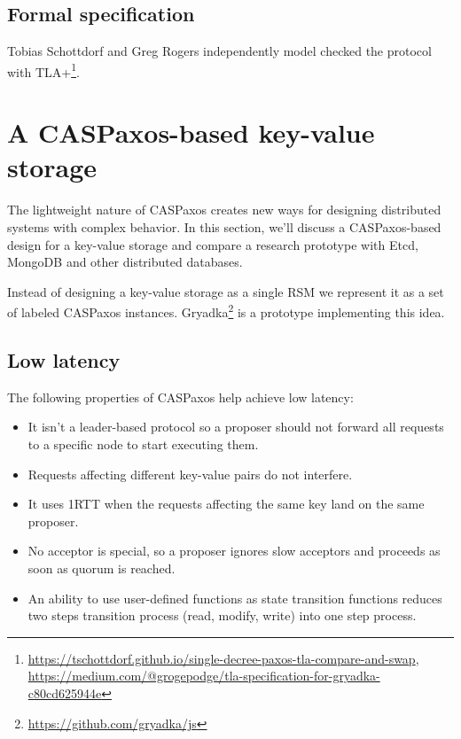 \documentclass[a4paper,USenglish]{lipics-v2018}
\theoremstyle{definition}
\begin{document}
\subsection{Formal specification}

Tobias Schottdorf and Greg Rogers independently model checked the protocol with TLA+\footnote{\href{https://tschottdorf.github.io/single-decree-paxos-tla-compare-and-swap}{https://tschottdorf.github.io/single-decree-paxos-tla-compare-and-swap}, \href{https://medium.com/@grogepodge/tla-specification-for-gryadka-c80cd625944e}{https://medium.com/@grogepodge/tla-specification-for-gryadka-c80cd625944e}}.

\section{A CASPaxos-based key-value storage}

The lightweight nature of CASPaxos creates new ways for designing distributed systems with complex behavior. In this section, we'll discuss a CASPaxos-based design for a key-value storage and compare a research prototype with Etcd, MongoDB and other distributed databases.

Instead of designing a key-value storage as a single RSM we represent it as a set of labeled CASPaxos instances. Gryadka\footnote{\href{https://github.com/gryadka/js}{https://github.com/gryadka/js}} is a prototype implementing this idea.

\subsection{Low latency}

The following properties of CASPaxos help achieve low latency:
\begin{itemize}[noitemsep]
  \item It isn't a leader-based protocol so a proposer should not forward all requests to a specific node to start executing them.
  \item Requests affecting different key-value pairs do not interfere.
  \item It uses 1RTT when the requests affecting the same key land on the same proposer.
  \item No acceptor is special, so a proposer ignores slow acceptors and proceeds as soon as quorum is reached.
  \item An ability to use user-defined functions as state transition functions reduces two steps transition process (read, modify, write) into one step process.
\end{itemize}
\end{document}
